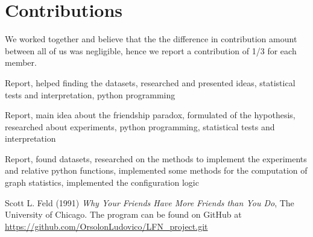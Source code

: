 \documentclass{article}
\begin{document}
\section*{Contributions}
We worked together and believe that the the difference in contribution amount between all of us was negligible, hence we report a contribution of 1/3 for each member.
\begin{description}[font=\normalfont\itshape]
    \item[Lavorati Ippolito:] Report, helped finding the datasets, researched and presented ideas, statistical tests and interpretation, python programming
    \item[Orsolon Ludovico:] Report, main idea about the friendship paradox, formulated of the hypothesis, researched about experiments, python programming, statistical tests and interpretation
    \item[Stefani Patrizia:] Report, found datasets, researched on the methods to implement the experiments and relative python functions, implemented some methods for the computation of graph statistics, implemented the configuration logic
\end{description}
\begin{thebibliography}{9}
Scott L. Feld (1991) \emph{Why Your Friends Have More Friends
than You Do}, The University of Chicago.
The program can be found on GitHub at \url{https://github.com/OrsolonLudovico/LFN_project.git}
\end{thebibliography}
\end{document}
